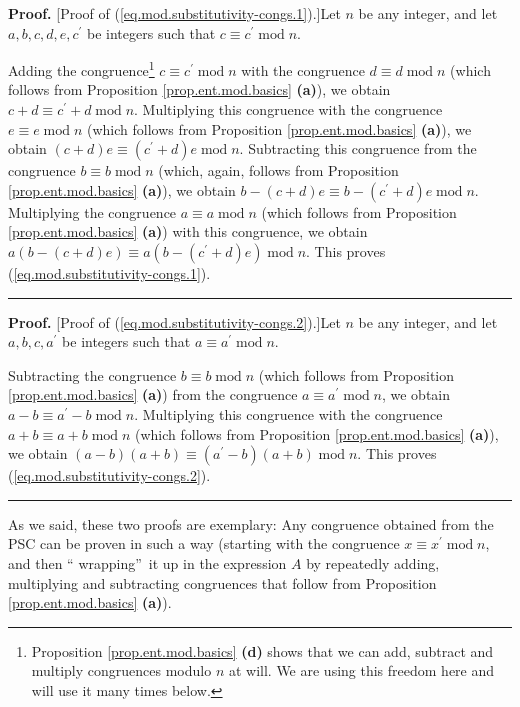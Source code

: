 \documentclass[numbers=enddot,12pt,final,onecolumn,notitlepage]{scrartcl}%
\numberwithin{exer}{subsection}
\theoremstyle{definition}
\newenvironment{proof}[1][Proof]{\noindent\textbf{#1.} }{\ \rule{0.5em}{0.5em}}
\begin{document}
\begin{proof}
[Proof of (\ref{eq.mod.substitutivity-congs.1}).]Let $n$ be any integer, and
let $a,b,c,d,e,c^{\prime}$ be integers such that $c\equiv c^{\prime
}\operatorname{mod}n$.

Adding the congruence\footnote{Proposition \ref{prop.ent.mod.basics}
\textbf{(d)} shows that we can add, subtract and multiply congruences modulo
$n$ at will. We are using this freedom here and will use it many times below.}
$c\equiv c^{\prime}\operatorname{mod}n$ with the congruence $d\equiv
d\operatorname{mod}n$ (which follows from Proposition
\ref{prop.ent.mod.basics} \textbf{(a)}), we obtain $c+d\equiv c^{\prime
}+d\operatorname{mod}n$. Multiplying this congruence with the congruence
$e\equiv e\operatorname{mod}n$ (which follows from Proposition
\ref{prop.ent.mod.basics} \textbf{(a)}), we obtain $\left(  c+d\right)
e\equiv\left(  c^{\prime}+d\right)  e\operatorname{mod}n$. Subtracting this
congruence from the congruence $b\equiv b\operatorname{mod}n$ (which, again,
follows from Proposition \ref{prop.ent.mod.basics} \textbf{(a)}), we obtain
$b-\left(  c+d\right)  e\equiv b-\left(  c^{\prime}+d\right)
e\operatorname{mod}n$. Multiplying the congruence $a\equiv a\operatorname{mod}%
n$ (which follows from Proposition \ref{prop.ent.mod.basics} \textbf{(a)})
with this congruence, we obtain $a\left(  b-\left(  c+d\right)  e\right)
\equiv a\left(  b-\left(  c^{\prime}+d\right)  e\right)  \operatorname{mod}n$.
This proves (\ref{eq.mod.substitutivity-congs.1}).
\end{proof}

\begin{proof}
[Proof of (\ref{eq.mod.substitutivity-congs.2}).]Let $n$ be any integer, and
let $a,b,c,a^{\prime}$ be integers such that $a\equiv a^{\prime}%
\operatorname{mod}n$.

Subtracting the congruence $b\equiv b\operatorname{mod}n$ (which follows from
Proposition \ref{prop.ent.mod.basics} \textbf{(a)}) from the congruence
$a\equiv a^{\prime}\operatorname{mod}n$, we obtain $a-b\equiv a^{\prime
}-b\operatorname{mod}n$. Multiplying this congruence with the congruence
$a+b\equiv a+b\operatorname{mod}n$ (which follows from Proposition
\ref{prop.ent.mod.basics} \textbf{(a)}), we obtain $\left(  a-b\right)
\left(  a+b\right)  \equiv\left(  a^{\prime}-b\right)  \left(  a+b\right)
\operatorname{mod}n$. This proves (\ref{eq.mod.substitutivity-congs.2}).
\end{proof}

As we said, these two proofs are exemplary: Any congruence obtained from the
PSC can be proven in such a way (starting with the congruence $x\equiv
x^{\prime}\operatorname{mod}n$, and then \textquotedblleft
wrapping\textquotedblright\ it up in the expression $A$ by repeatedly adding,
multiplying and subtracting congruences that follow from Proposition
\ref{prop.ent.mod.basics} \textbf{(a)}).
\end{document}
